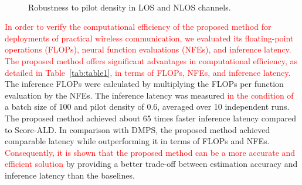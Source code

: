 \documentclass[lettersize,journal]{IEEEtran}
\newcommand{\tred}{\textcolor{red}}
\begin{document}
\begin{figure}[!t]
\\
\caption{Robustness to pilot density in LOS and NLOS channels.}
\label{fig_sim_2}
\end{figure}

\tred{In order to verify the computational efficiency of the proposed method for deployments of practical wireless communication, we evaluated its floating-point operations (FLOPs), neural function evaluations (NFEs), and inference latency. The proposed method offers significant advantages in computational efficiency, as detailed in Table~\ref{tab:table1}, in terms of FLOPs, NFEs, and inference latency.} The inference FLOPs were calculated by multiplying the FLOPs per function evaluation by the NFEs. The inference latency was measured \tred{in the condition of} a batch size of 100 and pilot density of 0.6, averaged over 10 independent runs. The proposed method achieved about 65 times faster inference latency compared to Score-ALD. In comparison with DMPS, the proposed method achieved comparable latency while outperforming it in terms of FLOPs and NFEs. \tred{Consequently, it is shown that the proposed method can be a more accurate and efficient solution} by providing a better trade-off between estimation accuracy and inference latency than the baselines.
\end{document}
